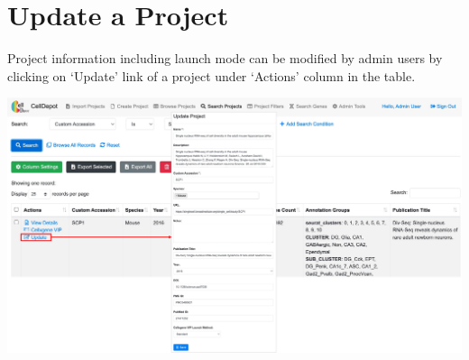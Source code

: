 \documentclass[runningheads]{llncs}
\begin{document}
\hypertarget{update-a-project}{%
\section{Update a Project}\label{update-a-project}}

Project information including launch mode can be modified by admin users by clicking on `Update' link of a project under `Actions' column in the table.

\href{figures/s11.jpg}{\includegraphics{figures/s11.jpg}}

  
\end{document}
